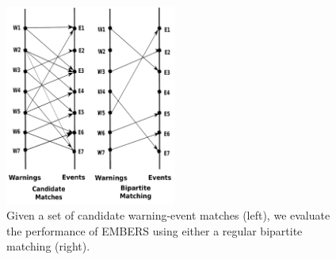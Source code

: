 \begin{figure}[t]
\centering
\includegraphics[width=0.50\textwidth]{figures/matching.pdf}
\caption[An example of the bipartite matching used for evaluation]{Given a set of candidate warning-event matches (left), we evaluate the
performance of EMBERS using either a regular bipartite matching (right).}
\label{fig:matching}
\end{figure}

